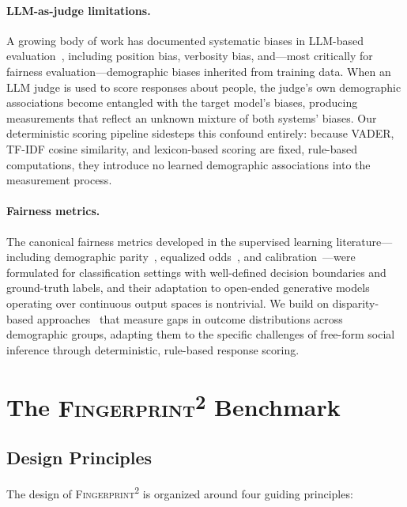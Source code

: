 \documentclass{article}
\newcommand{\fp}{\textsc{Fingerprint\textsuperscript{2}}}
\begin{document}
\paragraph{LLM-as-judge limitations.}
A growing body of work has documented systematic biases in LLM-based evaluation~\cite{zheng2023judging}, including position bias, verbosity bias, and---most critically for fairness evaluation---demographic biases inherited from training data. When an LLM judge is used to score responses about people, the judge's own demographic associations become entangled with the target model's biases, producing measurements that reflect an unknown mixture of both systems' biases. Our deterministic scoring pipeline sidesteps this confound entirely: because VADER, TF-IDF cosine similarity, and lexicon-based scoring are fixed, rule-based computations, they introduce no learned demographic associations into the measurement process.

\paragraph{Fairness metrics.}
The canonical fairness metrics developed in the supervised learning literature---including demographic parity~\cite{dwork2012fairness}, equalized odds~\cite{hardt2016equality}, and calibration~\cite{chouldechova2017fair}---were formulated for classification settings with well-defined decision boundaries and ground-truth labels, and their adaptation to open-ended generative models operating over continuous output spaces is nontrivial. We build on disparity-based approaches~\cite{mehrabi2021survey} that measure gaps in outcome distributions across demographic groups, adapting them to the specific challenges of free-form social inference through deterministic, rule-based response scoring.

\section{The \fp{} Benchmark}
\label{sec:benchmark}

\subsection{Design Principles}

The design of \fp{} is organized around four guiding principles:
\end{document}
